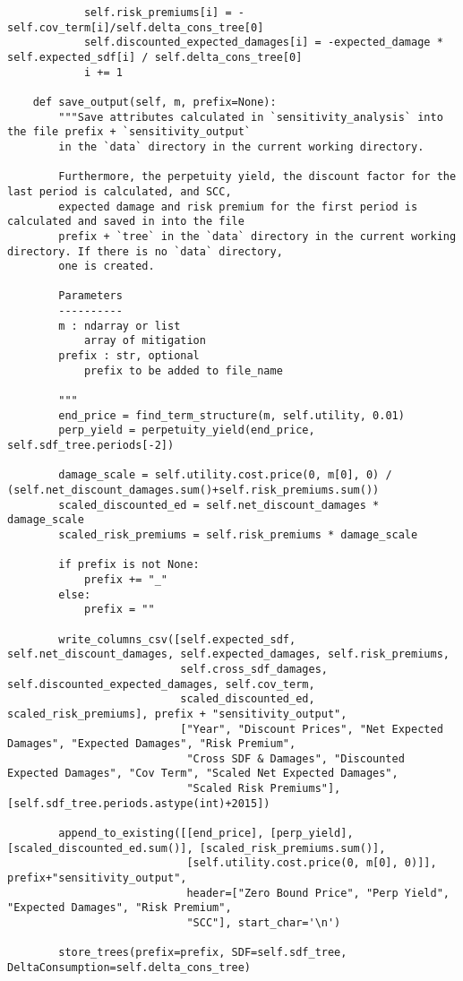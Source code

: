 \documentclass[12pt]{article}
\begin{document}
\begin{verbatim}
			self.risk_premiums[i] = -self.cov_term[i]/self.delta_cons_tree[0]
			self.discounted_expected_damages[i] = -expected_damage * self.expected_sdf[i] / self.delta_cons_tree[0]
			i += 1

	def save_output(self, m, prefix=None):
		"""Save attributes calculated in `sensitivity_analysis` into the file prefix + `sensitivity_output`
		in the `data` directory in the current working directory.

		Furthermore, the perpetuity yield, the discount factor for the last period is calculated, and SCC,
		expected damage and risk premium for the first period is calculated and saved in into the file
		prefix + `tree` in the `data` directory in the current working directory. If there is no `data` directory,
		one is created.

		Parameters
		----------
		m : ndarray or list
			array of mitigation
		prefix : str, optional
			prefix to be added to file_name

		"""
		end_price = find_term_structure(m, self.utility, 0.01)
		perp_yield = perpetuity_yield(end_price, self.sdf_tree.periods[-2])

		damage_scale = self.utility.cost.price(0, m[0], 0) / (self.net_discount_damages.sum()+self.risk_premiums.sum())
		scaled_discounted_ed = self.net_discount_damages * damage_scale
		scaled_risk_premiums = self.risk_premiums * damage_scale

		if prefix is not None:
			prefix += "_"
		else:
			prefix = ""

		write_columns_csv([self.expected_sdf, self.net_discount_damages, self.expected_damages, self.risk_premiums,
			               self.cross_sdf_damages, self.discounted_expected_damages, self.cov_term,
			               scaled_discounted_ed, scaled_risk_premiums], prefix + "sensitivity_output",
						   ["Year", "Discount Prices", "Net Expected Damages", "Expected Damages", "Risk Premium",
						    "Cross SDF & Damages", "Discounted Expected Damages", "Cov Term", "Scaled Net Expected Damages",
						    "Scaled Risk Premiums"], [self.sdf_tree.periods.astype(int)+2015])

		append_to_existing([[end_price], [perp_yield], [scaled_discounted_ed.sum()], [scaled_risk_premiums.sum()],
			                [self.utility.cost.price(0, m[0], 0)]], prefix+"sensitivity_output",
			                header=["Zero Bound Price", "Perp Yield", "Expected Damages", "Risk Premium",
							"SCC"], start_char='\n')
		
		store_trees(prefix=prefix, SDF=self.sdf_tree, DeltaConsumption=self.delta_cons_tree)
\end{verbatim}
\end{document}
